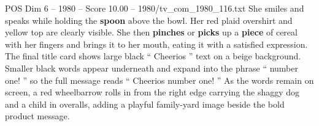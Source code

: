 \begin{textsample}{POS Dim 6 – 1980 – Score 10.00 – 1980/tv\_com\_1980\_116.txt}
She smiles and speaks while holding the \textbf{spoon} above the bowl.
Her red plaid overshirt and yellow top are clearly visible.
She then \textbf{pinches} or \textbf{picks} up a \textbf{piece} of cereal with her fingers and brings it to her mouth, eating it with a satisfied expression.
The final title card shows large black “ Cheerios ” text on a beige background.
Smaller black words appear underneath and expand into the phrase “ number one! ” so the full message reads “ Cheerios number one! ” As the words remain on screen, a red wheelbarrow rolls in from the right edge carrying the shaggy dog and a child in overalls, adding a playful family-yard image beside the bold product message.

\end{textsample}
